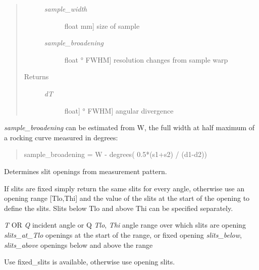 \documentclass[letterpaper,10pt,english]{sphinxmanual}
\begin{document}
\begin{fulllineitems}
\begin{fulllineitems}
\begin{quote}
\begin{description}
\begin{description}
\item[{\emph{sample\_width}}] \leavevmode{[}float \textbar{} mm{]}
size of sample

\item[{\emph{sample\_broadening}}] \leavevmode{[}float \textbar{} ° FWHM{]}
resolution changes from sample warp

\end{description}

\item[{Returns }] \leavevmode\begin{description}
\item[{\emph{dT}}] \leavevmode{[}{[}float{]} \textbar{} ° FWHM{]}
angular divergence

\end{description}

\end{description}\end{quote}

\emph{sample\_broadening} can be estimated from W, the full width at half
maximum of a rocking curve measured in degrees:
\begin{quote}

sample\_broadening = W - degrees( 0.5*(s1+s2) / (d1-d2))
\end{quote}

\end{fulllineitems}


\begin{fulllineitems}
\label{api/instrument:refl1d.instrument.Monochromatic.calc_slits}
Determines slit openings from measurement pattern.

If slits are fixed simply return the same slits for every angle,
otherwise use an opening range {[}Tlo,Thi{]} and the value of the
slits at the start of the opening to define the slits.  Slits
below Tlo and above Thi can be specified separately.

\emph{T} OR \emph{Q}       incident angle or Q
\emph{Tlo}, \emph{Thi}     angle range over which slits are opening
\emph{slits\_at\_Tlo}   openings at the start of the range, or fixed opening
\emph{slits\_below}, \emph{slits\_above}   openings below and above the range

Use fixed\_slits is available, otherwise use opening slits.

\end{fulllineitems}


\end{fulllineitems}
\end{document}
